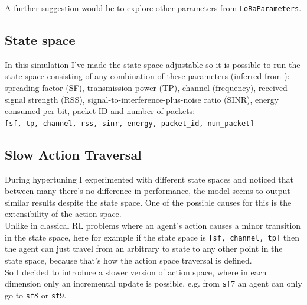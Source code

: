 A further suggestion would be to explore other parameters from \texttt{LoRaParameters}.

\subsection{State space}
In this simulation I've made the state space adjustable 
so it is possible to run the state space consisting of any 
combination of these parameters (inferred from
\cite{rl_lora_original}): spreading factor (SF), 
transmission power (TP), channel (frequency), received signal
strength (RSS), signal-to-interference-plus-noise ratio (SINR),
energy consumed per bit, packet ID and number of packets:\\
\texttt{[sf, tp, channel, rss, sinr, energy, packet\_id, num\_packet]}

\subsection{Slow Action Traversal}
During hypertuning I experimented with different state spaces
and noticed that between many there's no difference in 
performance, the model seems to output similar results
despite the state space. One of the possible causes for this
is the extensibility of the action space. \\

Unlike in classical RL problems where an agent's action causes
a minor transition in the state space, here for example if 
the state space is \texttt{[sf, channel, tp]} then the agent can just travel from an arbitrary to state to any other point
in the state space, because that's how the action space 
traversal is defined. \\

So I decided to introduce a slower version of action space,
where in each dimension only an incremental update is possible, e.g. from \texttt{sf}7 an agent can only go to \texttt{sf}8 or \texttt{sf}9.



